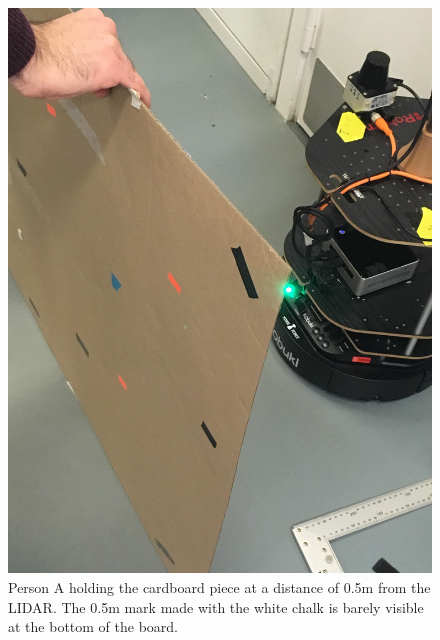 \begin{figure}[H]
    \centering
    \begin{minipage}[b]{0.5\linewidth}
        \includegraphics[width=\textwidth]{figures/AccuracySetup1.jpg}
        \caption{Person A holding the cardboard piece at a distance of 0.5m from the LIDAR. The 0.5m mark made with the white chalk is barely visible at the bottom of the board.}
        \label{fig:AccuracySetup1}
    \end{minipage}
    \hspace{0.2cm}
    \begin{minipage}[b]{0.45\linewidth}

\end{minipage}
\end{figure}
